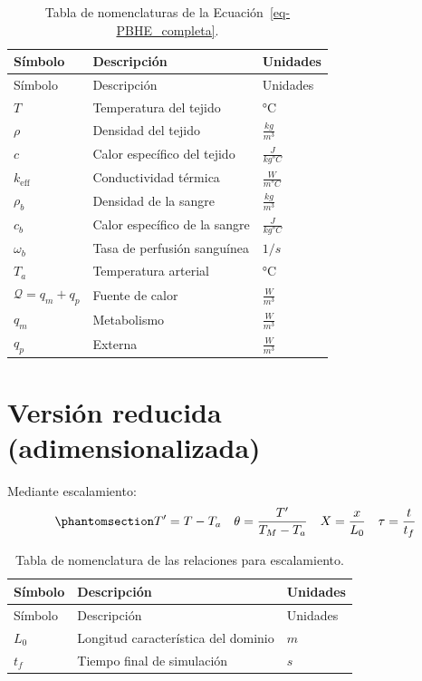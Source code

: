 \documentclass[
  spanish,
  us-letterpaper,
]{scrreprt}
\theoremstyle{definition}
\theoremstyle{plain}
\theoremstyle{remark}
\begin{document}
\begin{longtable}[]{@{}lll@{}}
\caption{Tabla de nomenclaturas de la
Ecuación~\ref{eq-PBHE_completa}.}\label{tbl-nomenclatura-PBHE_completa}\tabularnewline
\toprule\noalign{}
Símbolo & Descripción & Unidades \\
\midrule\noalign{}
\endfirsthead
\toprule\noalign{}
Símbolo & Descripción & Unidades \\
\midrule\noalign{}
\endhead
\bottomrule\noalign{}
\endlastfoot
\(T\) & Temperatura del tejido & °C \\
\(\rho\) & Densidad del tejido & \(\frac{kg}{m^3}\) \\
\(c\) & Calor específico del tejido & \(\frac{J}{kg °C}\) \\
\(k_{\text{eff}}\) & Conductividad térmica & \(\frac{W}{m °C}\) \\
\(\rho_b\) & Densidad de la sangre & \(\frac{kg}{m^3}\) \\
\(c_b\) & Calor específico de la sangre & \(\frac{J}{kg °C}\) \\
\(\omega_b\) & Tasa de perfusión sanguínea & \(1/s\) \\
\(T_a\) & Temperatura arterial & °C \\
\(\mathcal{Q} = q_m + q_p\) & Fuente de calor & \(\frac{W}{m^3}\) \\
\(q_m\) & Metabolismo & \(\frac{W}{m^3}\) \\
\(q_p\) & Externa & \(\frac{W}{m^3}\) \\
\end{longtable}

\section{Versión reducida
(adimensionalizada)}\label{versiuxf3n-reducida-adimensionalizada}

Mediante escalamiento:
\begin{equation}\phantomsection\label{eq-adimencionalizadores}{
T' = T - T_a \quad \theta = \dfrac{T'}{T_M - T_a} \quad X = \dfrac{x}{L_0} \quad \tau = \dfrac{t}{t_f}
}\end{equation}

\begin{longtable}[]{@{}lll@{}}
\caption{Tabla de nomenclatura de las relaciones para
escalamiento.}\label{tbl-}\tabularnewline
\toprule\noalign{}
Símbolo & Descripción & Unidades \\
\midrule\noalign{}
\endfirsthead
\toprule\noalign{}
Símbolo & Descripción & Unidades \\
\midrule\noalign{}
\endhead
\bottomrule\noalign{}
\endlastfoot
\(L_0\) & Longitud característica del dominio & \(m\) \\
\(t_f\) & Tiempo final de simulación & \(s\) \\
\end{longtable}
\end{document}
